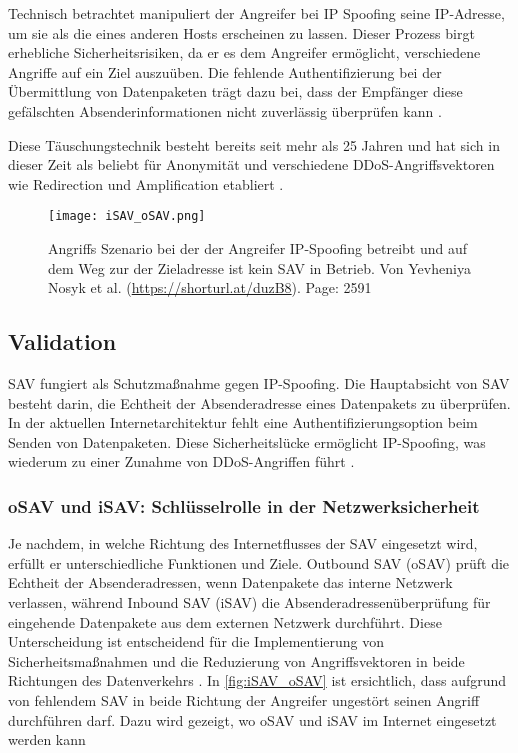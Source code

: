 \documentclass[sigplan,screen]{acmart}
\begin{document}
Technisch betrachtet manipuliert der Angreifer bei IP Spoofing seine IP-Adresse, um sie als die eines anderen Hosts erscheinen zu lassen. Dieser Prozess birgt erhebliche Sicherheitsrisiken, da er es dem Angreifer ermöglicht, verschiedene Angriffe auf ein Ziel auszuüben. Die fehlende Authentifizierung bei der Übermittlung von Datenpaketen trägt dazu bei, dass der Empfänger diese gefälschten Absenderinformationen nicht zuverlässig überprüfen kann \cite{Beverly01}.

Diese Täuschungstechnik besteht bereits seit mehr als 25 Jahren und hat sich in dieser Zeit als beliebt für Anonymität und verschiedene DDoS-Angriffsvektoren wie Redirection und Amplification etabliert \cite{manrs01}.

\begin{figure}[h]
  \centering
  \texttt{[image: iSAV\_oSAV.png]}
  \caption{Angriffs Szenario bei der der Angreifer IP-Spoofing betreibt und auf dem Weg zur der Zieladresse ist kein SAV in Betrieb. Von Yevheniya Nosyk et al. (\url{https://shorturl.at/duzB8}). Page: 2591}
  \label{fig:iSAV_oSAV}
\end{figure}

\subsection{Validation}
SAV fungiert als Schutzmaßnahme gegen IP-Spoofing. Die Hauptabsicht von SAV besteht darin, die Echtheit der Absenderadresse eines Datenpakets zu überprüfen. In der aktuellen Internetarchitektur fehlt eine Authentifizierungsoption beim Senden von Datenpaketen. Diese Sicherheitslücke ermöglicht IP-Spoofing, was wiederum zu einer Zunahme von DDoS-Angriffen führt \cite{Hal01}.

\subsubsection{oSAV und iSAV: Schlüsselrolle in der Netzwerksicherheit}
Je nachdem, in welche Richtung des Internetflusses der SAV eingesetzt wird, erfüllt er unterschiedliche Funktionen und Ziele. Outbound SAV (oSAV) prüft die Echtheit der Absenderadressen, wenn Datenpakete das interne Netzwerk verlassen, während Inbound SAV (iSAV) die Absenderadressenüberprüfung für eingehende Datenpakete aus dem externen Netzwerk durchführt. Diese Unterscheidung ist entscheidend für die Implementierung von Sicherheitsmaßnahmen und die Reduzierung von Angriffsvektoren in beide Richtungen des Datenverkehrs \cite{Hal01}. 
In \autoref{fig:iSAV_oSAV} ist ersichtlich, dass aufgrund von fehlendem SAV in beide Richtung der Angreifer ungestört seinen Angriff durchführen darf. Dazu wird gezeigt, wo oSAV und iSAV im Internet eingesetzt werden kann
\end{document}
